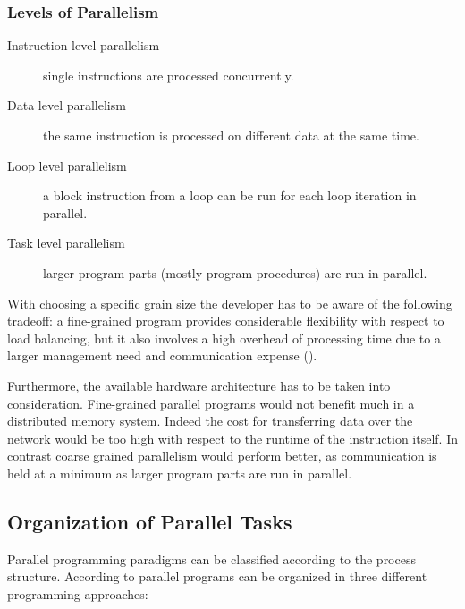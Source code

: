 \subsubsection{Levels of Parallelism}
\begin{description}
\item[Instruction level parallelism] single instructions are processed
  concurrently.
\item[Data level parallelism] the same instruction is processed on
  different data at the same time.
\item[Loop level parallelism] a block instruction from a loop can be
  run for each loop iteration in parallel.
\item[Task level parallelism] larger program parts (mostly
  program procedures) are run in parallel.
\end{description}

With choosing a specific grain size the developer has to be aware of
the following tradeoff: a fine-grained program provides considerable
flexibility with respect to load 
balancing, but it also involves 
a high overhead of processing time due to a larger management need and
communication expense (\cite{sevcikova04simulations}).

Furthermore, the available hardware architecture has to be taken
into consideration. Fine-grained parallel programs would not benefit
much in a distributed memory system. Indeed the cost for transferring
data over the network would be too high with respect to the runtime of
the instruction itself. In contrast coarse grained parallelism would
perform better, as communication is held at a minimum as larger
program parts are run in parallel.

\subsection{Organization of Parallel Tasks}

Parallel programming paradigms can be classified according to the
process structure. According to \cite{geist94pvm} parallel programs can be
organized in three different programming approaches:

